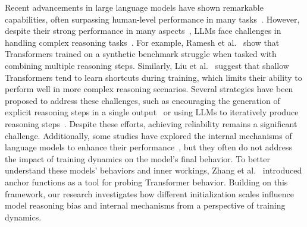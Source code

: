 Recent advancements in large language models have shown remarkable capabilities, often surpassing human-level performance in many tasks~\cite{fu2022does, wei2022emergent}. However, despite their strong performance in many aspects~\cite{srivastava2022beyond}, LLMs face challenges in handling complex reasoning tasks~\cite{csordas2021neural, dziri2024faith, hupkes2018learning, lepori2023break, okawa2023compositional, yun2022vision, wang2024towards, csordas2022ctl}. For example, Ramesh et al.~\cite{ramesh2023capable} show that Transformers trained on a synthetic benchmark struggle when tasked with combining multiple reasoning steps. Similarly, Liu et al.~\cite{liu2022transformers} suggest that shallow Transformers tend to learn shortcuts during training, which limits their ability to perform well in more complex reasoning scenarios. Several strategies have been proposed to address these challenges, such as encouraging the generation of explicit reasoning steps in a single output~\cite{wei2022chain} or using LLMs to iteratively produce reasoning steps~\cite{creswell2022selection, creswell2022faithful}. Despite these efforts, achieving reliability remains a significant challenge. Additionally, some studies have explored the internal mechanisms of language models to enhance their performance~\cite{wang2024improving, wang2024understanding, wang2023label}, but they often do not address the impact of training dynamics on the model's final behavior. To better understand these models' behaviors and inner workings, Zhang et al.~\cite{zhang2024anchor} introduced anchor functions as a tool for probing Transformer behavior. Building on this framework, our research investigates how different initialization scales influence model reasoning bias and internal mechanisms from a perspective of training dynamics.


